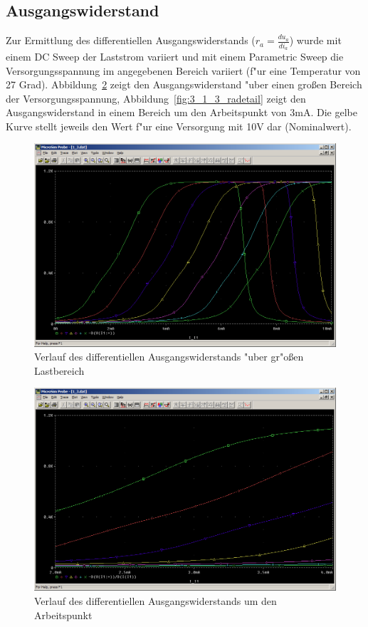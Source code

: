 \subsection{Ausgangswiderstand}

Zur Ermittlung des differentiellen Ausgangswiderstands ($r_a = \frac{du_a}{di_a}$) wurde mit einem DC Sweep der Laststrom variiert und mit einem Parametric Sweep die Versorgungsspannung im angegebenen Bereich variiert (f"ur eine Temperatur von 27 Grad). Abbildung~\ref{fig:3_1_3_ra} zeigt den Ausgangswiderstand "uber einen gro\ss{}en Bereich der Versorgungsspannung, Abbildung~\ref{fig:3_1_3_radetail} zeigt den Ausgangswiderstand in einem Bereich um den Arbeitspunkt von 3mA. Die gelbe Kurve stellt jeweils den Wert f"ur eine Versorgung mit 10V dar (Nominalwert).

\begin{figure}%
	\centering
	\includegraphics[width=\textwidth]{fig/bsp1/3_1_3_ra.PNG}
	\caption{Verlauf des differentiellen Ausgangswiderstands "uber gr"o\ss{}en Lastbereich}
	\label{fig:3_1_3_ra}
\end{figure}

\begin{figure}%
	\centering
	\includegraphics[width=\textwidth]{fig/bsp1/3_1_3_radetail.PNG}
	\caption{Verlauf des differentiellen Ausgangswiderstands um den Arbeitspunkt}
	\label{fig:3_1_3_ra}
\end{figure}



